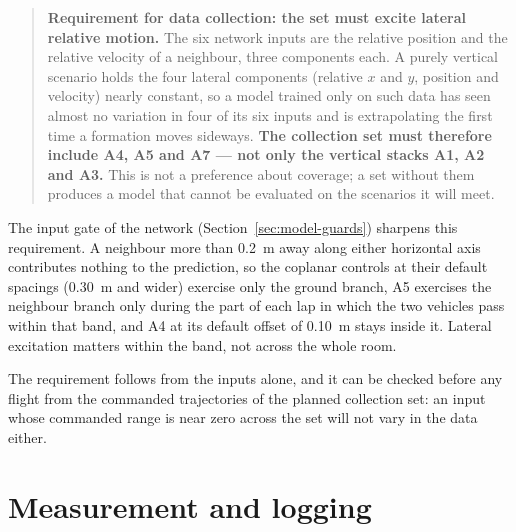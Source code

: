\begin{quote}
\textbf{Requirement for data collection: the set must excite lateral relative motion.}
The six network inputs are the relative position and the relative velocity of a neighbour, three
components each. A purely vertical scenario holds the four lateral components (relative $x$ and $y$,
position and velocity) nearly constant, so a model trained only on such data has seen almost no
variation in four of its six inputs and is extrapolating the first time a formation moves sideways. \textbf{The collection set must therefore include A4, A5
and A7 --- not only the vertical stacks A1, A2 and A3.} This is not a preference about coverage; a
set without them produces a model that cannot be evaluated on the scenarios it will meet.
\end{quote}

The input gate of the network (Section~\ref{sec:model-guards}) sharpens this requirement. A
neighbour more than \SI{0.2}{\metre} away along either horizontal axis contributes nothing to the
prediction, so the coplanar controls at their default spacings (\SI{0.30}{\metre} and wider) exercise
only the ground branch, A5 exercises the neighbour branch only during the part of each lap in which
the two vehicles pass within that band, and A4 at its default offset of \SI{0.10}{\metre} stays inside
it. Lateral excitation matters within the band, not across the whole room.

The requirement follows from the inputs alone, and it can be checked before any flight from the
commanded trajectories of the planned collection set: an input whose commanded range is near zero
across the set will not vary in the data either.

\section{Measurement and logging}
\label{sec:setup-logging}


